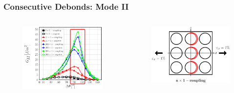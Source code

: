 \documentclass[first,firstsupp,lastsupp,last,hyperref,table]{ETHclass}
\begin{document}
\begin{frame}
\frametitle{\vspace{0.2cm}\small Consecutive Debonds: Mode II}
\vspace{-0.5cm}
\centering
\begin{columns}
\centering
\begin{column}{0.65\textwidth}
\centering
\begin{figure}
\centering
\includegraphics[width=\columnwidth]{nx1-coupling-vf60-GII-dtheta110.pdf}
\end{figure}
\end{column}
\begin{column}{0.35\textwidth}
\centering
\begin{figure}
\centering
\includegraphics[width=\columnwidth]{twofibers-sameside-dtheta110.pdf}

\end{figure}
\end{column}
\end{columns}
\end{frame}
\end{document}
